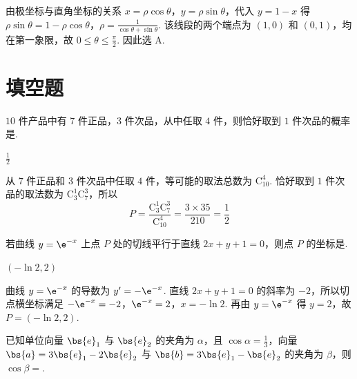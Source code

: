 \begin{solution}
由极坐标与直角坐标的关系 \(x=\rho\cos\theta\)，\(y=\rho\sin\theta\)，代入 \(y=1-x\) 得
\(\rho\sin\theta=1-\rho\cos\theta\)，\(\rho=\frac1{\cos\theta+\sin\theta}\).
该线段的两个端点为 \((1,0)\) 和 \((0,1)\)，均在第一象限，故 \(0\leqslant\theta\leqslant\frac\pi2\). 因此选 A.
\end{solution}

\section{填空题}

\begin{problem}
\(10\) 件产品中有 \(7\) 件正品，\(3\) 件次品，从中任取 \(4\) 件，则恰好取到 \(1\) 件次品的概率是\fillinblank{}.
\end{problem}

\begin{answer}
\(\frac{1}{2}\)
\end{answer}

\begin{solution}
从 \(7\) 件正品和 \(3\) 件次品中任取 \(4\) 件，等可能的取法总数为 \(\mathrm C_{10}^{4}\). 恰好取到 \(1\) 件次品的取法数为 \(\mathrm C_{3}^{1}\mathrm C_{7}^{3}\)，所以
\[
P=\frac{\mathrm C_{3}^{1}\mathrm C_{7}^{3}}{\mathrm C_{10}^{4}}=\frac{3\times35}{210}=\frac12
\]
\end{solution}

\begin{problem}
若曲线 \( y = \e^{-x} \) 上点 \(P\) 处的切线平行于直线 \( 2x + y + 1 = 0 \)，则点 \(P\) 的坐标是\fillinblank{}.
\end{problem}

\begin{answer}
\((-\ln 2,2)\)
\end{answer}

\begin{solution}
曲线 \(y=\e^{-x}\) 的导数为 \(y'=-\e^{-x}\). 直线 \(2x+y+1=0\) 的斜率为 \(-2\)，所以切点横坐标满足
\(-\e^{-x}=-2\)，\(\e^{-x}=2\)，\(x=-\ln2\).
再由 \(y=\e^{-x}\) 得 \(y=2\)，故 \(P=(-\ln2,2)\).
\end{solution}

\begin{problem}
已知单位向量 \(\bs{e}_1\) 与 \(\bs{e}_2\) 的夹角为 \(\alpha\)，且 \(\cos \alpha = \frac{1}{3}\)，向量 \(\bs{a} = 3\bs{e}_1 - 2\bs{e}_2\) 与 \(\bs{b} = 3\bs{e}_1 - \bs{e}_2\) 的夹角为 \(\beta\)，则 \(\cos \beta =\)\fillinblank{}.
\end{problem}

